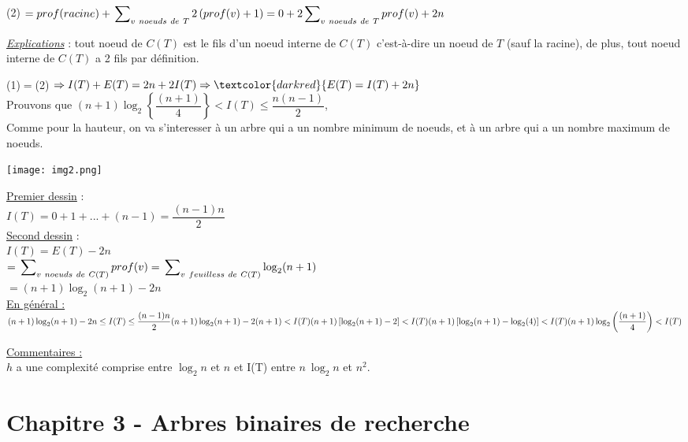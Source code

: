 \documentclass{article}
\begin{document}
\begin{enumerate}
(2) $ = prof(racine) + \sideset{}{_{v\ noeuds\ de\ T}}\sum{2\left(prof(v)+1\right)} = 0 + 2
\sideset{}{_{v\ noeuds\ de\ T}}\sum{prof(v)} + 2n$

\underline{\textit{Explications}} : tout noeud de $C(T)$ est le fils d'un noeud interne de $C(T)$ c'est-à-dire un noeud 
de $T$ (sauf la racine), de plus, tout noeud interne de $C(T)$ a 2 fils par définition.

(1)$=$(2) $\Rightarrow I(T)+E(T) = 2n+2I(T) \Rightarrow \textcolor{darkred}{E(T) = I(T) + 2n}$ \\

Prouvons que $(n+1) \log_2\left\{\dfrac{(n+1)}{4}\right\} < I(T) \leq \dfrac{n(n-1)}{2}$, \\

Comme pour la hauteur, on va s'interesser à un arbre qui a un nombre minimum de noeuds, et à un arbre qui a un nombre
maximum de noeuds.

\texttt{[image: img2.png]}

\underline{Premier dessin} : \\ $I(T) = 0+1+...+(n-1) = \dfrac{(n-1)n}{2}$ \\
\underline{Second dessin} : \\ $I(T) = E(T) - 2n$ \\
$ = \sideset{}{_{v\ noeuds\ de\ C(T)}}\sum{prof(v)} = \sideset{}{_{v\ feuilless\ de\ C(T)}}\sum{\log_2(n+1)}$ \\
$ = (n+1)\log_2(n+1)-2n$ \\

\underline{En général : } \\
$(n+1)\log_2(n+1)-2n \leq I(T) \leq \dfrac{(n-1)n}{2} \\
(n+1)\log_2(n+1)-2(n+1) < I(T)  \\ 
(n+1) \left[ \log_2(n+1) - 2 \right] < I(T) \\
(n+1) \left[ \log_2(n+1) - \log_2(4) \right] < I(T)  \\
(n+1) \log_2\left(\dfrac{(n+1)}{4} \right) < I(T) \\$

\underline{Commentaires : } \\

$h$ a une complexité comprise entre $\log_2n$ et $n$ et I(T) entre $n\ \log_2n$ et $n^2$.

\end{enumerate}

\section{Chapitre 3 - Arbres binaires de recherche}
\end{document}

